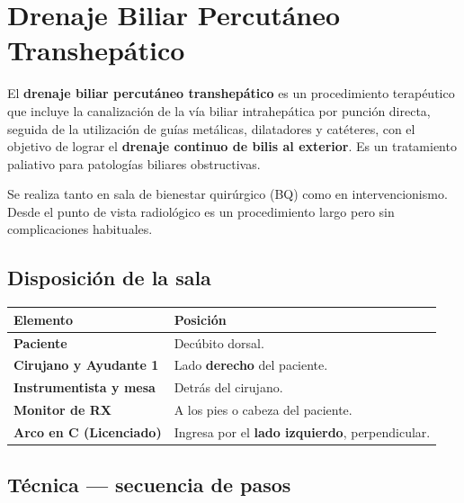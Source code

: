 \section*{Drenaje Biliar Percutáneo Transhepático}

\begin{cajadefinicion}
	El \textbf{drenaje biliar percutáneo transhepático} es un procedimiento terapéutico que incluye la canalización de la vía biliar intrahepática por punción directa, seguida de la utilización de guías metálicas, dilatadores y catéteres, con el objetivo de lograr el \textbf{drenaje continuo de bilis al exterior}. Es un tratamiento paliativo para patologías biliares obstructivas.
\end{cajadefinicion}

Se realiza tanto en sala de bienestar quirúrgico (BQ) como en intervencionismo. Desde el punto de vista radiológico es un procedimiento largo pero sin complicaciones habituales.

\subsection*{Disposición de la sala}

\begin{center}
	\begin{tabular}{>{\bfseries}p{4cm} p{9.5cm}}
		\toprule
		Elemento & Posición \\
		\midrule
		Paciente & Decúbito dorsal. \\[0.3em]
		Cirujano y Ayudante 1 & Lado \textbf{derecho} del paciente. \\[0.3em]
		Instrumentista y mesa & Detrás del cirujano. \\[0.3em]
		Monitor de RX & A los pies o cabeza del paciente. \\[0.3em]
		Arco en C (Licenciado) & Ingresa por el \textbf{lado izquierdo}, perpendicular. \\
		\bottomrule
	\end{tabular}
\end{center}

\subsection*{Técnica --- secuencia de pasos}

